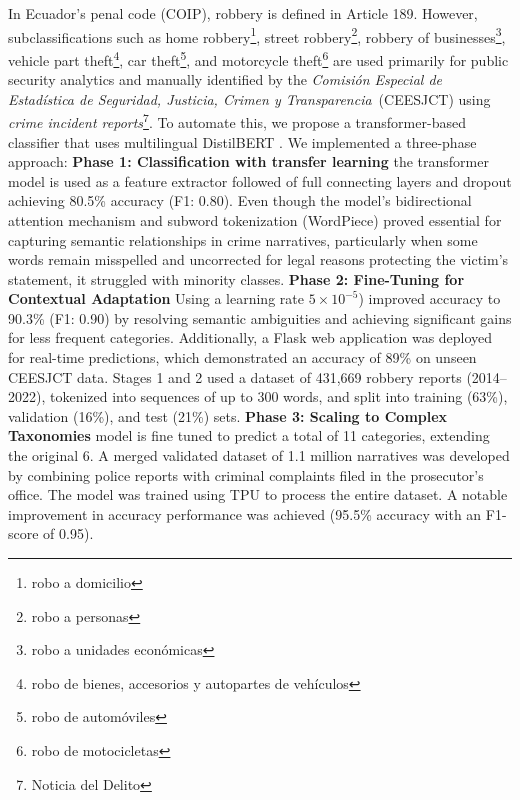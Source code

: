 \documentclass[runningheads]{llncs}
\newcommand{\printnombrecomision}{Comisión Especial de Estadística de
  Seguridad, Justicia, Crimen y Transparencia}
\begin{document}
In Ecuador’s penal code (COIP), robbery is defined in Article
189. However, subclassifications such as home robbery\footnote{robo a
  domicilio}, street robbery\footnote{robo a personas}, robbery of
businesses\footnote{robo a unidades económicas}, vehicle part
theft\footnote{robo de bienes, accesorios y autopartes de vehículos},
car theft\footnote{robo de automóviles}, and motorcycle
theft\footnote{robo de motocicletas} are used primarily for public
security analytics and manually identified by the
\textit{\printnombrecomision}\ (CEESJCT) using \textit{crime incident
  reports}\footnote{Noticia del Delito}. To automate this, we propose
a transformer-based classifier that uses multilingual DistilBERT
\cite{Sanh2019DistilBERTAD}.  We implemented a three-phase approach:
\textbf{Phase 1: Classification with transfer learning} the
transformer model is used as a feature extractor followed of full
connecting layers and dropout achieving 80.5\% accuracy (F1:
0.80). Even though the model’s bidirectional attention mechanism and
subword tokenization (WordPiece) proved essential for capturing
semantic relationships in crime narratives, particularly when some
words remain misspelled and uncorrected for legal reasons protecting
the victim's statement, it struggled with minority
classes. \textbf{Phase 2: Fine-Tuning for Contextual Adaptation} Using
a learning rate $5 \times 10^{-5}$) improved accuracy to 90.3\% (F1:
0.90) by resolving semantic ambiguities and achieving significant
gains for less frequent categories. Additionally, a Flask web
application was deployed for real-time predictions, which demonstrated
an accuracy of 89\% on unseen CEESJCT data. Stages 1 and 2 used a
dataset of 431,669 robbery reports (2014–2022), tokenized into
sequences of up to 300 words, and split into training (63\%),
validation (16\%), and test (21\%) sets. \textbf{Phase 3: Scaling to
  Complex Taxonomies} model is fine tuned to predict a total of 11
categories, extending the original 6. A merged validated dataset of
1.1 million narratives was developed by combining police reports with
criminal complaints filed in the prosecutor's office. The model was
trained using TPU to process the entire dataset. A notable improvement
in accuracy performance was achieved (95.5\% accuracy with an F1-score
of 0.95).

\end{document}
